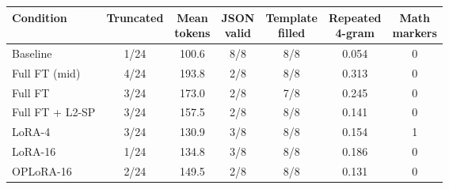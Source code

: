 \begin{tabular}{lcccccc}
\toprule
Condition & Truncated & \shortstack{Mean\\tokens} & \shortstack{JSON\\valid} & \shortstack{Template\\filled} & \shortstack{Repeated\\4-gram} & \shortstack{Math\\markers} \\
\midrule
Baseline & 1/24 & 100.6 & 8/8 & 8/8 & 0.054 & 0 \\
Full FT (mid) & 4/24 & 193.8 & 2/8 & 8/8 & 0.313 & 0 \\
Full FT & 3/24 & 173.0 & 2/8 & 7/8 & 0.245 & 0 \\
Full FT + L2-SP & 3/24 & 157.5 & 2/8 & 8/8 & 0.141 & 0 \\
LoRA-4 & 3/24 & 130.9 & 3/8 & 8/8 & 0.154 & 1 \\
LoRA-16 & 1/24 & 134.8 & 3/8 & 8/8 & 0.186 & 0 \\
OPLoRA-16 & 2/24 & 149.5 & 2/8 & 8/8 & 0.131 & 0 \\
\bottomrule
\end{tabular}